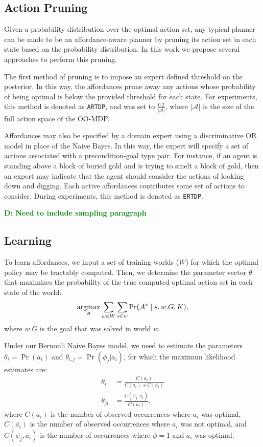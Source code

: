 \documentclass[conference]{IEEEtran}
\newcommand{\dnote}[1]{\textcolor{Green}{\textbf{D: #1}}}
\newcommand{\argmax}{\operatornamewithlimits{argmax}}
\begin{document}
\subsection{Action Pruning}
\label{sec:action_pruning}
Given a probability distribution over the optimal action set, any typical
planner can be made to be an affordance-aware planner by pruning its action
set in each state based on the probability distribution. In this work we propose several approaches to perform this pruning.

The first method of pruning is to impose an expert defined threshold on the posterior. In this way, the affordances prune away any actions whose probability of being optimal is below the provided threshold for each state. For experiments, this method is denoted as \texttt{ARTDP}, and was set to $\frac{0.2}{|\mathcal{A}|}$, where $|\mathcal{A}|$ is the size of the full action space of the OO-MDP.

Affordances may also be specified by a domain expert using a discriminative OR model in place of the Naive Bayes. In this way, the expert will specify a set of actions associated with a precondition-goal type pair. For instance, if an agent is standing above a block of buried gold and is trying to smelt a block of gold, then an expert may indicate that the agent should consider the actions of looking down and digging. Each active affordances contributes some set of actions to consider. During experiments, this method is denoted as \texttt{ERTDP}.

\dnote{Need to include sampling paragraph}


\subsection{Learning}

To learn affordances, we input a set of training worlds ($W$) for which the optimal policy
may be tractably computed. Then, we determine the parameter vector $\theta$ that 
maximizes the probability of the true computed optimal action set in each state of the world:
\begin{equation}
\argmax_\theta \sum_{w \in W} \sum_{s \in w} \Pr(\mathcal{A}^* \mid s, w.G, K),
\end{equation}
where $w.G$ is the goal that was solved in world $w$.

Under our Bernouli Naive Bayes model, we need to estimate the parameters $\theta_i = \Pr(a_i)$ and $\theta_{i,j} = \Pr(\phi_j | a_i)$, for which the maximum likelihood estimates are:
\begin{align}
\theta_i &= \frac{C(a_i)}{C(a_i) + C(\bar{a_i})} \\
\theta_{ji} &= \frac{C(\phi_j, a_i)}{C(a_i)},
\end{align}
where $C(a_i)$ is the number of observed occurrences where $a_i$ was optimal,
$C(\bar{a_i})$ is the number of observed occurrences where $a_i$ was not optimal,
and $C(\phi_j, a_i)$ is the number of occurrences where $\phi=1$ and $a_i$ was optimal.
\end{document}
